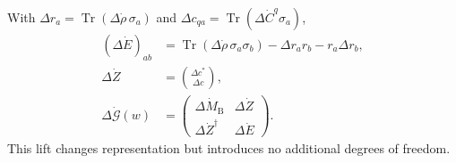 \documentclass[10pt,twocolumn]{article}
\newcommand{\Tr}{\operatorname{Tr}}
\newcommand{\MB}{M_{\mathrm B}}
\begin{document}
With $\Delta r_a=\Tr(\Delta\dot\rho\,\sigma_a)$ and
$\Delta c_{qa}=\Tr(\Delta\dot C^q\sigma_a)$,
\begin{equation}
\begin{aligned}
(\Delta\dot E)_{ab}
&=\Tr(\Delta\dot\rho\,\sigma_a\sigma_b)
-\Delta r_ar_b-r_a\Delta r_b,\\
\Delta\dot Z&=\binom{\Delta c^*}{\Delta c},\\
\Delta\dot{\mathcal G}(w)&=
\begin{pmatrix}\Delta\dot\MB&\Delta\dot Z\\
\Delta\dot Z^\dagger&\Delta\dot E\end{pmatrix}.
\end{aligned}
\label{eq:joint-lift}
\end{equation}
This lift changes representation but introduces no additional degrees of
freedom.
\end{document}
